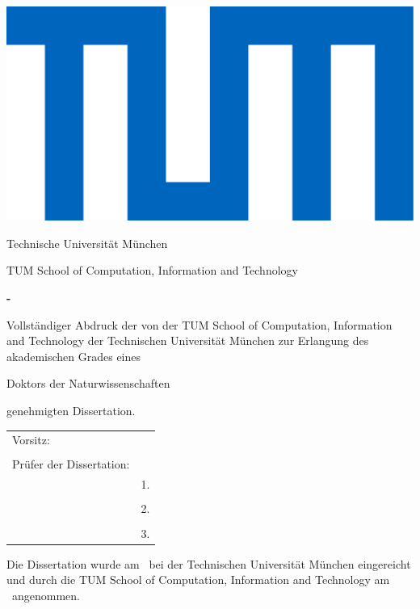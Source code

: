 \thispagestyle{empty}
\hfill
\includegraphics[height=0.1\textwidth]{assets/logo_tum.pdf}
\vspace*{0.5cm}

\begin{center}
	{\Large Technische Universit\"at M\"unchen}
\end{center}
\vspace*{0.5cm}

\begin{center}
	{\Large TUM School of Computation, Information and Technology}
\end{center}
\vspace*{0.5cm}


\begin{center}
	{
		\LARGE\textbf{\getTitle - }\par
		\vspace{0.3cm}
		\large \textbf{\getSubTitle}\par
	}
\end{center}
\vspace*{0.5cm}

\begin{center}
	{\Large \textbf{\getAuthor}}
\end{center}
\vspace*{1.0cm}

\vfill
{\setlength{\parindent}{0cm} Vollst\"andiger Abdruck der von der TUM School of Computation, Information and Technology der Technischen Universit\"at M\"unchen zur Erlangung des akademischen Grades eines}
\begin{center}
	{Doktors der Naturwissenschaften}
\end{center}
{genehmigten Dissertation.}
\vspace*{1cm}
\begin{table}[h]
	\centering
	\begin{tabular}{ll}
		{Vorsitz:}  & {\;\;\; \getChairman} \\
		& \\
		{Pr\"ufer der Dissertation:} & \\
		& {1. \getSupervisor} \\
		& \\	
		& {2. \getExaminer} \\
		& \\
		& {3. \getSecondExaminer} \\
	\end{tabular}
\end{table}
\vspace*{1cm}

{\setlength{\parindent}{0cm} Die Dissertation wurde am \getSubmissionDate\ bei
	der Technischen Universit\"at M\"unchen eingereicht und durch die
	TUM School of Computation, Information and Technology
	am \getAcceptanceDate\ angenommen.}

\pagestyle{empty}